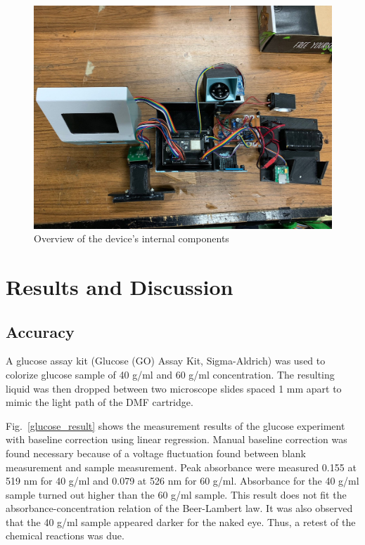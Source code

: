 \documentclass[conference]{IEEEtran}
\begin{document}
    \begin{figure}[htbp]
    \centerline{\includegraphics[scale=0.5]{hardware-2.jpg}}
    \caption{Overview of the device's internal components}
    \label{hardware}
    \end{figure}

\section{Results and Discussion}
\subsection{Accuracy}
A glucose assay kit (Glucose (GO) Assay Kit, Sigma-Aldrich) was used to colorize glucose sample of 40 {\textmu}g/ml and 60 {\textmu}g/ml concentration.
The resulting liquid was then dropped between two microscope slides spaced 1 mm apart to mimic the light path of the DMF cartridge.

Fig.~\ref{glucose_result} shows the measurement results of the glucose experiment with baseline correction using linear regression.
Manual baseline correction was found necessary because of a voltage fluctuation found between blank measurement and sample measurement.
Peak absorbance were measured 0.155 at 519 nm for 40 {\textmu}g/ml and 0.079 at 526 nm for 60 {\textmu}g/ml.
Absorbance for the 40 {\textmu}g/ml sample turned out higher than the 60 {\textmu}g/ml sample.
This result does not fit the absorbance-concentration relation of the Beer-Lambert law.
It was also observed that the 40 {\textmu}g/ml sample appeared darker for the naked eye.
Thus, a retest of the chemical reactions was due.
\end{document}
